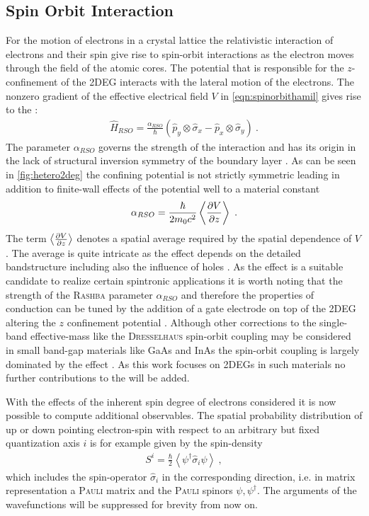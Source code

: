 \subsection{Spin Orbit Interaction}
For the motion of electrons in a crystal lattice the relativistic interaction of electrons and their spin give rise to spin-orbit interactions as the electron moves through the field of the atomic cores.
The potential that is responsible for the $z$-confinement of the 2DEG interacts with the lateral motion of the electrons. The nonzero gradient of the effective electrical field $V$ in \cref{eqn:spinorbithamil} gives rise to the \rash{} \hamil{}:
\begin{align}
  \hat{H}_{RSO} =\frac{\alpha_{RSO}}{\hbar}(\hat{p}_{y} \otimes \hat{\sigma}_{x} - \hat{p}_{x} \otimes \hat{\sigma}_{y})\ .
	\label{eqn:rashbahamiltonian}
\end{align}
The parameter $\alpha_{RSO}$ governs the strength of the interaction and has its origin in the lack of structural inversion symmetry of the boundary layer \cite{PhysRevB.70.233311}.
As can be seen in \cref{fig:hetero2deg} the confining potential is not strictly symmetric leading in addition to finite-wall effects of the potential well to a material constant \cite{Metalidis2007Thesis}
\begin{align}
\alpha_{RSO} = \frac{\hbar}{2m_0c^2} \left<\frac{\partial V}{\partial z} \right>\ .
\label{eqn:alpharashba}
\end{align}
The term $\left<\frac{\partial V}{\partial z} \right>$ denotes a spatial average required by the spatial dependence of $V$. The average is quite intricate as the effect depends on the detailed bandstructure including also the influence of holes \cite{JApplPhys.83.4324}.
As the \rash{} effect is a suitable candidate to realize certain spintronic applications it is worth noting that the strength of the \textsc{Rashba} parameter $\alpha_{RSO}$ and therefore the properties of conduction can be tuned by the addition of a gate electrode on top of the 2DEG altering the $z$ confinement potential \cite{PhysRevLett.78.1335}.
Although other corrections to the single-band effective-mass \hamil{} like the \textsc{Dresselhaus} spin-orbit coupling \cite{PhysRev.100.580} may be considered in small band-gap materials like GaAs and InAs the spin-orbit coupling is largely dominated by the \rash{} effect \cite{PhysRevB.61.15588}. As this work focuses on 2DEGs in such materials no further contributions to the \hamil{} will be added.\par
With the effects of the inherent spin degree of electrons considered it is now possible to compute additional observables. The spatial probability distribution of up or down pointing electron-spin with respect to an arbitrary but fixed quantization axis $i$ is for example given by the spin-density \cite{JPhysA:MathGen.18.671}
\begin{align}
S^i  = \frac{\hbar}{2} \left< \psi^{\dagger} \hat{\sigma}_i \psi \right>\ ,
\label{eqn:spindensity}
\end{align}
which includes the spin-operator $\hat{\sigma}_i$ in the corresponding direction, i.e. in matrix representation a \textsc{Pauli} matrix and the \textsc{Pauli} spinors $\psi,\psi^{\dagger}$. The arguments of the wavefunctions will be suppressed for brevity from now on.

